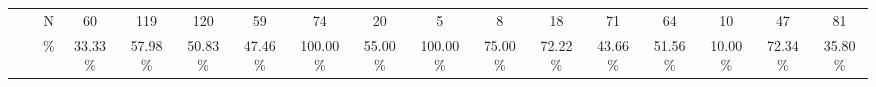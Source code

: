 \documentclass{sigchi}
\begin{document}
\begin{table}[t]
\begin{adjustbox}{width=1\textwidth}
\begin{tabular}{ccccccccccccccccc}
			\multicolumn{1}{|c|}{}                               & \multicolumn{1}{c|}{}                        & \multicolumn{1}{c|}{N}     & \multicolumn{1}{c|}{\cellcolor[HTML]{ACDDAA}60}           & \multicolumn{1}{c|}{\cellcolor[HTML]{ACDDAA}119}         & \multicolumn{1}{c|}{120}                                  & \multicolumn{1}{c|}{59}                                  & \multicolumn{1}{c|}{\cellcolor[HTML]{ACDDAA}74}                & \multicolumn{1}{c|}{\cellcolor[HTML]{ACDDAA}20}             & \multicolumn{1}{c|}{\cellcolor[HTML]{ACDDAA}5}        & \multicolumn{1}{c|}{\cellcolor[HTML]{ACDDAA}8}       & \multicolumn{1}{c|}{\cellcolor[HTML]{ACDDAA}18}      & \multicolumn{1}{c|}{\cellcolor[HTML]{ACDDAA}71}      & \multicolumn{1}{c|}{\cellcolor[HTML]{ACDDAA}64}      & \multicolumn{1}{c|}{\cellcolor[HTML]{ACDDAA}10}      & \multicolumn{1}{c|}{\cellcolor[HTML]{ACDDAA}47}           & \multicolumn{1}{c|}{\cellcolor[HTML]{ACDDAA}81}          \\ \cline{3-17} 
			\multicolumn{1}{|c|}{}                               & \multicolumn{1}{c|}{}                        & \multicolumn{1}{c|}{\%}  & \multicolumn{1}{c|}{\cellcolor[HTML]{ACDDAA}33.33\%}      & \multicolumn{1}{c|}{\cellcolor[HTML]{ACDDAA}57.98\%}     & \multicolumn{1}{c|}{50.83\%}                              & \multicolumn{1}{c|}{47.46\%}                             & \multicolumn{1}{c|}{\cellcolor[HTML]{ACDDAA}100.00\%}          & \multicolumn{1}{c|}{\cellcolor[HTML]{ACDDAA}55.00\%}        & \multicolumn{1}{c|}{\cellcolor[HTML]{ACDDAA}100.00\%} & \multicolumn{1}{c|}{\cellcolor[HTML]{ACDDAA}75.00\%} & \multicolumn{1}{c|}{\cellcolor[HTML]{ACDDAA}72.22\%} & \multicolumn{1}{c|}{\cellcolor[HTML]{ACDDAA}43.66\%} & \multicolumn{1}{c|}{\cellcolor[HTML]{ACDDAA}51.56\%} & \multicolumn{1}{c|}{\cellcolor[HTML]{ACDDAA}10.00\%} & \multicolumn{1}{c|}{\cellcolor[HTML]{ACDDAA}72.34\%}      & \multicolumn{1}{c|}{\cellcolor[HTML]{ACDDAA}35.80\%}     \\ \cline{3-17} 

\end{tabular}
\end{adjustbox}
\end{table}
\end{document}
